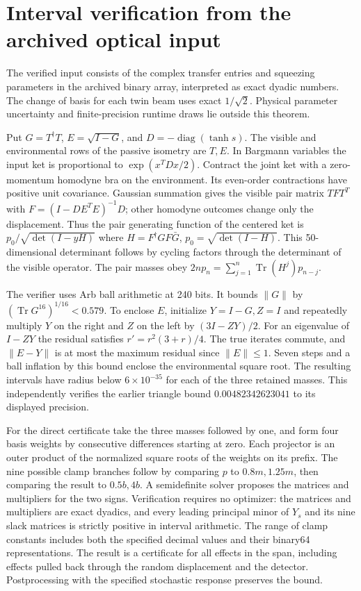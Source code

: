\documentclass[11pt]{article}
\newcommand{\tr}{\operatorname{Tr}}
\begin{document}
\section{Interval verification from the archived optical input}\label{sec:interval}
The verified input consists of the complex transfer entries and squeezing parameters in the archived binary array, interpreted as exact dyadic numbers. The change of basis for each twin beam uses exact $1/\sqrt2$. Physical parameter uncertainty and finite-precision runtime draws lie outside this theorem.

Put $G=T^\dagger T$, $E=\sqrt{I-G}$, and $D=-\operatorname{diag}(\tanh s)$. The visible and environmental rows of the passive isometry are $T,E$. In Bargmann variables the input ket is proportional to $\exp(x^TDx/2)$. Contract the joint ket with a zero-momentum homodyne bra on the environment. Its even-order contractions have positive unit covariance. Gaussian summation gives the visible pair matrix $TFT^T$ with $F=(I-DE^TE)^{-1}D$; other homodyne outcomes change only the displacement. Thus the pair generating function of the centered ket is $p_0/\sqrt{\det(I-yH)}$ where $H=F^\dagger G F\bar G$, $p_0=\sqrt{\det(I-H)}$. This 50-dimensional determinant follows by cycling factors through the determinant of the visible operator. The pair masses obey $2n p_n=\sum_{j=1}^n\tr(H^j)p_{n-j}$.

The verifier uses Arb ball arithmetic \cite{arb} at 240 bits. It bounds $\|G\|$ by $(\tr G^{16})^{1/16}<0.579$. To enclose $E$, initialize $Y=I-G,Z=I$ and repeatedly multiply $Y$ on the right and $Z$ on the left by $(3I-ZY)/2$. For an eigenvalue of $I-ZY$ the residual satisfies $r'=r^2(3+r)/4$. The true iterates commute, and $\|E-Y\|$ is at most the maximum residual since $\|E\|\le1$. Seven steps and a ball inflation by this bound enclose the environmental square root. The resulting intervals have radius below $6\times10^{-35}$ for each of the three retained masses. This independently verifies the earlier triangle bound $0.00482342623041$ to its displayed precision.

For the direct certificate take the three masses followed by one, and form four basis weights by consecutive differences starting at zero. Each projector is an outer product of the normalized square roots of the weights on its prefix. The nine possible clamp branches follow by comparing $p$ to $0.8m,1.25m$, then comparing the result to $0.5b,4b$. A semidefinite solver \cite{clarabel} proposes the matrices and multipliers for the two signs. Verification requires no optimizer: the matrices and multipliers are exact dyadics, and every leading principal minor of $Y_s$ and its nine slack matrices is strictly positive in interval arithmetic. The range of clamp constants includes both the specified decimal values and their binary64 representations. The result is a certificate for all effects in the span, including effects pulled back through the random displacement and the detector. Postprocessing with the specified stochastic response preserves the bound.
\end{document}
